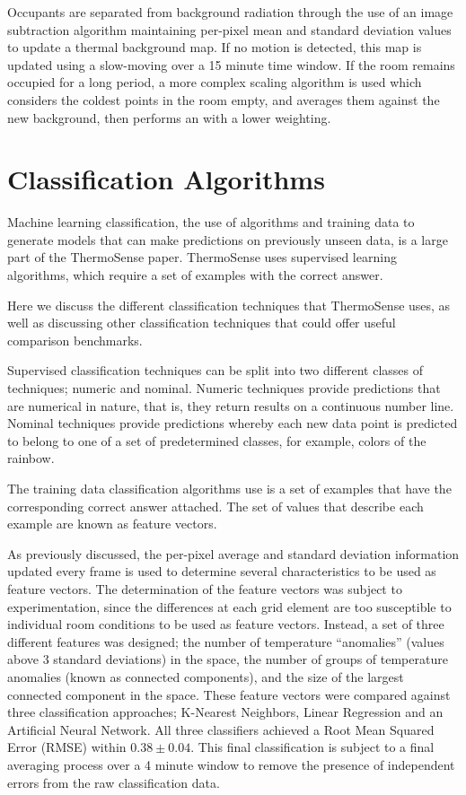 \documentclass[../thesis/thesis.tex]{subfiles}
\begin{document}
Occupants are separated from background radiation through the use of an image subtraction algorithm maintaining per-pixel mean and standard deviation values to update a thermal background map. If no motion is detected, this map is updated using a slow-moving \emwa over a 15 minute time window. If the room remains occupied for a long period, a more complex scaling algorithm is used which considers the coldest points in the room empty, and averages them against the new background, then performs an \emwa with a lower weighting.

\section{Classification Algorithms}
\label{sec:classification}
Machine learning classification, the use of algorithms and training data to generate models that can make predictions on previously unseen data, is a large part of the ThermoSense paper. ThermoSense uses supervised learning algorithms, which require a set of examples with the correct answer.

Here we discuss the different classification techniques that ThermoSense uses, as well as discussing other classification techniques that could offer useful comparison benchmarks.

Supervised classification techniques can be split into two different classes of techniques; numeric and nominal. Numeric techniques provide predictions that are numerical in nature, that is, they return results on a continuous number line. Nominal techniques provide predictions whereby each new data point is predicted to belong to one of a set of predetermined classes, for example, colors of the rainbow.

The training data classification algorithms use is a set of examples that have the corresponding correct answer attached. The set of values that describe each example are known as feature vectors.

As previously discussed, the per-pixel average and standard deviation information updated every frame is used to determine several characteristics to be used as feature vectors. The determination of the feature vectors was subject to experimentation, since the differences at each grid element are too susceptible to individual room conditions to be used as feature vectors. Instead, a set of three different features was designed; the number of temperature ``anomalies'' (values above 3 standard deviations) in the space, the number of groups of temperature anomalies (known as connected components), and the size of the largest connected component in the space. These feature vectors were compared against three classification approaches; K-Nearest Neighbors, Linear Regression and an Artificial Neural Network. All three classifiers achieved a Root Mean Squared Error (RMSE) within $0.38\pm0.04$. This final classification is subject to a final averaging process over a 4 minute window to remove the presence of independent errors from the raw classification data.
\end{document}
